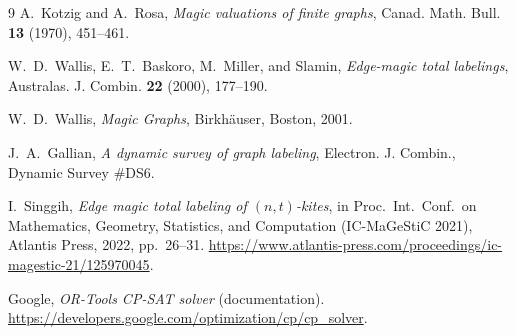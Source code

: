 \documentclass[11pt,a4paper]{article}
\theoremstyle{plain}
\theoremstyle{definition}
\theoremstyle{remark}
\begin{document}
\begin{thebibliography}{9}
  A.~Kotzig and A.~Rosa,
  \emph{Magic valuations of finite graphs},
  Canad. Math. Bull. \textbf{13} (1970), 451--461.

  W.~D.~Wallis, E.~T.~Baskoro, M.~Miller, and Slamin,
  \emph{Edge-magic total labelings},
  Australas. J. Combin. \textbf{22} (2000), 177--190.

  W.~D.~Wallis,
  \emph{Magic Graphs},
  Birkh\"auser, Boston, 2001.

  J.~A.~Gallian,
  \emph{A dynamic survey of graph labeling},
  Electron. J. Combin., Dynamic Survey \#DS6.

  I.~Singgih,
  \emph{Edge magic total labeling of $(n,t)$-kites},
  in Proc.\ Int.\ Conf.\ on Mathematics, Geometry, Statistics, and Computation
  (IC-MaGeStiC 2021), Atlantis Press, 2022, pp.\ 26--31.
  \url{https://www.atlantis-press.com/proceedings/ic-magestic-21/125970045}.

  Google,
  \emph{OR-Tools CP-SAT solver} (documentation).
  \url{https://developers.google.com/optimization/cp/cp_solver}.
\end{thebibliography}
\end{document}
